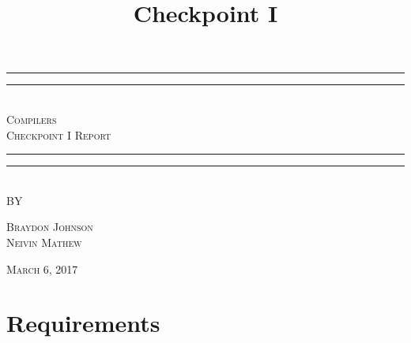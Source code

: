 \documentclass[12pt,letterpaper]{article}
\title{Checkpoint I}
\begin{document}
\begin{titlepage}
    \centering
    \vspace*{\baselineskip}
    \rule{\textwidth}{1.6pt}\vspace*{-\baselineskip}\vspace*{2pt}
    \rule{\textwidth}{0.4pt}\\[1.5\baselineskip]
    {\LARGE \textsc{Compilers \\ Checkpoint I Report}}\\[\baselineskip]
	\rule{\textwidth}{0.4pt}\vspace*{-\baselineskip}\vspace{4pt}    
    \rule{\textwidth}{2pt}\\[2\baselineskip]
   
    \vspace*{7\baselineskip}
    \textsc{BY}
    
    \vspace*{0.25\baselineskip}
    {\textsc{Braydon Johnson \\ Neivin Mathew} \par}
    \vfill
    {\scshape March 6, 2017} \\
  \end{titlepage}
  
  
\tableofcontents
\lhead{} %
\clearpage
{} %
    
\clearpage
\section{Requirements}
\end{document}
